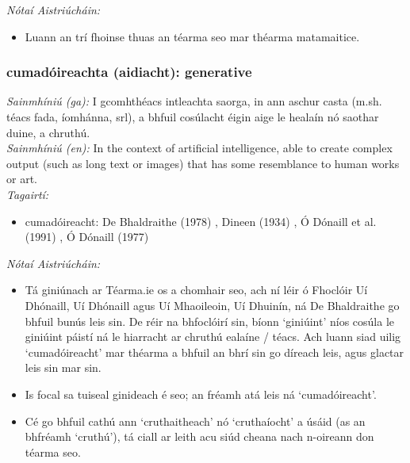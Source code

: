 \documentclass{article}
\begin{document}
 \noindent \textit{Nótaí Aistriúcháin:}
\begin{itemize}
	\item Luann an trí fhoinse thuas an téarma seo mar théarma matamaitice.
\end{itemize}


\subsubsection*{cumadóireachta (aidiacht): generative}
 \noindent \textit{Sainmhíniú (ga):} I gcomhthéacs intleachta saorga, in ann aschur casta (m.sh. téacs fada, íomhánna, srl), a bhfuil cosúlacht éigin aige le healaín nó saothar duine, a chruthú.
\\
 \noindent \textit{Sainmhíniú (en):} In the context of artificial intelligence, able to create complex output (such as long text or images) that has some resemblance to human works or art.
\\
 \noindent \textit{Tagairtí:}
\begin{itemize}
	\item cumadóireacht: De Bhaldraithe (1978) \cite{de-bhaldraithe}, Dineen (1934) \cite{dineen}, Ó Dónaill et al. (1991) \cite{focloir-beag}, Ó Dónaill (1977) \cite{odonaill}
\end{itemize}

 \noindent \textit{Nótaí Aistriúcháin:}
\begin{itemize}
	\item Tá giniúnach ar Téarma.ie os a chomhair seo, ach ní léir ó Fhoclóir Uí Dhónaill, Uí Dhónaill agus Uí Mhaoileoin, Uí Dhuinín, ná De Bhaldraithe go bhfuil bunús leis sin. De réir na bhfoclóirí sin, bíonn `giniúint' níos cosúla le giniúint páistí ná le hiarracht ar chruthú ealaíne / téacs. Ach luann siad uilig `cumadóireacht' mar théarma a bhfuil an bhrí sin go díreach leis, agus glactar leis sin mar sin.
	\item Is focal sa tuiseal ginideach é seo; an fréamh atá leis ná `cumadóireacht'.
	\item Cé go bhfuil cathú ann `cruthaitheach' nó `cruthaíocht' a úsáid (as an bhfréamh `cruthú'), tá ciall ar leith acu siúd cheana nach n-oireann don téarma seo.
\end{itemize}
\end{document}

